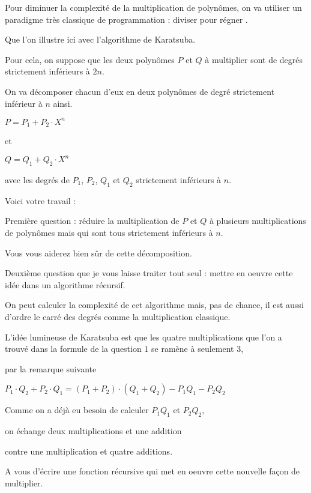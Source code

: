 \change

Pour diminuer la complexité de la multiplication de polynômes, 
on va utiliser un paradigme très classique de programmation :
\og diviser pour régner \fg. 

\change

Que l'on illustre ici avec l'algorithme de Karatsuba.

\change

Pour cela, on suppose que les deux polynômes  $P$ et $Q$  à multiplier
sont de degrés strictement inférieurs à $2n$.

\change

On va décomposer chacun d'eux en deux polynômes de degré strictement inférieur à $n$ ainsi.

$P = P_1 + P_2 \cdot X^n$

et 

$Q = Q_1 + Q_2 \cdot X^n$

\change

avec les degrés de $P_1$, $P_2$, $Q_1$ et $Q_2$ strictement inférieurs à $n$.

\change

Voici votre travail :

Première question : réduire la multiplication de $P$ et $Q$ à plusieurs 
multiplications de polynômes mais qui sont tous strictement inférieurs à $n$.

Vous vous aiderez bien sûr de cette décomposition.

Deuxième question que je vous laisse traiter tout seul : mettre en oeuvre cette idée 
dans un algorithme récursif.

On peut calculer la complexité de cet algorithme mais, pas de chance, il est aussi
d'ordre le carré des degrés comme la multiplication classique.

L'idée lumineuse de Karatsuba est que les quatre multiplications 
que l'on a trouvé dans la formule de la question $1$ se ramène à seulement $3$,

par la remarque suivante 

$P_1 \cdot Q_2 + P_2 \cdot Q_1 = (P_1 + P_2 ) \cdot (Q_1 + Q_2 ) - P_1 Q_1 - P_2 Q_2$


Comme on a déjà eu besoin de calculer $P_1Q_1$ et $P_2Q_2$,

on échange deux multiplications et une addition

contre une multiplication et quatre additions.

A vous d'écrire une fonction récursive qui met en oeuvre cette nouvelle façon de multiplier.

